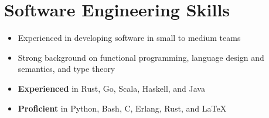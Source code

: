 \documentclass[10pt]{article} %
\begin{document}

\section{Software Engineering Skills}

\begin{itemize} \itemsep-1pt
\item{Experienced in developing software in small to medium teams}

\item{Strong background on functional programming, language design and semantics, and type theory}

\item{\textbf{Experienced} in Rust, Go, Scala, Haskell, and Java}

\item{\textbf{Proficient} in Python, Bash, C, Erlang, Rust, and \LaTeX}

\end{itemize}

\end{document}

